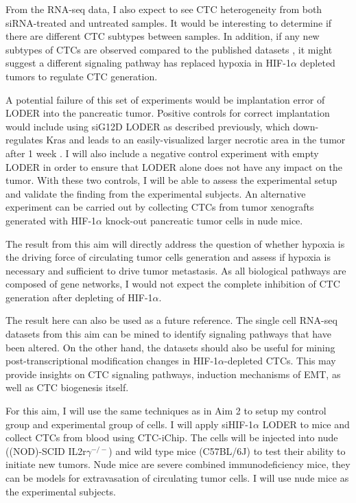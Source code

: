 \documentclass[11pts]{article}
\begin{document}
\noindent From the RNA-seq data, I also expect to see CTC heterogeneity from both siRNA-treated and untreated samples. It would be interesting to determine if there are different CTC subtypes between samples. In addition, if any new subtypes of CTCs are observed compared to the published datasets \cite{Ting:zl}, it might suggest a different signaling pathway has replaced hypoxia in HIF-1$\alpha$ depleted tumors to regulate CTC generation. 
\newline

\noindent A potential failure of this set of experiments would be implantation error of LODER into the pancreatic tumor. Positive controls for correct implantation would include using siG12D LODER as described previously, which down-regulates Kras and leads to an easily-visualized larger necrotic area in the tumor after 1 week  \cite{Zorde-Khvalevsky:2013fk}.  I will also include a negative control experiment with empty LODER in order to ensure that LODER alone does not have any impact on the tumor. With these two controls, I will be able to assess the experimental setup and validate the finding from the experimental subjects. An alternative experiment can be carried out by collecting CTCs from tumor xenografts generated with HIF-1$\alpha$ knock-out pancreatic tumor cells in nude mice.   
\newline

\noindent The result from this aim will directly address the question of whether hypoxia is the driving force of circulating tumor cells generation and assess if hypoxia is necessary and sufficient to drive tumor metastasis. As all biological pathways are composed of gene networks, I would not expect the complete inhibition of CTC generation after depleting of HIF-1$\alpha$. 
\newline

\noindent The result here can also be used as a future reference. The single cell RNA-seq datasets from this aim can be mined to identify signaling pathways that have been altered. On the other hand, the datasets should also be useful for mining post-transcriptional modification changes in HIF-1$\alpha$-depleted CTCs. This may provide insights on CTC signaling pathways, induction mechanisms of EMT, as well as CTC biogenesis itself.
 \newline

\newline
\noindent For this aim, I will use the same techniques as in Aim 2 to setup my control group and experimental group of cells. I will apply siHIF-1$\alpha$ LODER to mice and collect CTCs from blood using CTC-iChip. The cells will be injected into nude ((NOD)-SCID IL2r$\gamma^{-/-}$) and wild type mice (C57BL/6J) to test their ability to initiate new tumors. Nude mice are severe combined immunodeficiency mice, they can be models for extravasation of circulating tumor cells. I will use nude mice as the experimental subjects. 
\newline
\end{document}
